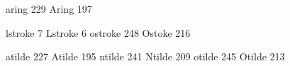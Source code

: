  aring             229
 Aring             197

 lstroke             7
 Lstroke             6
 ostroke           248
 Ostoke            216

 atilde            227
 Atilde            195
 ntilde            241
 Ntilde            209
 otilde            245
 Otilde            213

\stopencoding

\endinput
